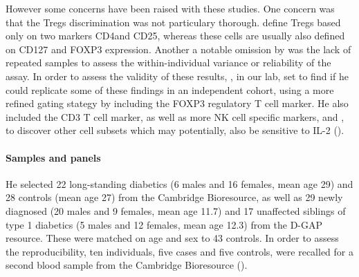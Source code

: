 However some concerns have been raised with these studies.
One concern was that the Tregs discrimination was not particulary thorough.
\citet{Long:2010ej} define Tregs based only on two markers CD4\positive and CD25\positive, whereas these cells are usually also defined on CD127 and FOXP3 expression.
Another a notable omission by \citet{Long:2010ej} was the lack of repeated samples to assess the within-individual variance or reliability of the assay.
In order to assess the validity of these results, , in our lab, set to find if he could replicate some of these findings in an independent cohort, using a more refined gating stategy by including the FOXP3 regulatory T cell marker.
He also included the CD3 T cell marker, as well as more NK cell specific markers,  and ,
to discover other cell subsets which may potentially, also be sensitive to IL-2 ().

\paragraph{Samples and panels}

He selected 22 long-standing diabetics (6 males and 16 females, mean age 29) and 28 controls (mean age 27) from the Cambridge Bioresource, as well as 29 newly diagnosed (20 males and 9 females, mean age 11.7) and 17 unaffected siblings of type 1 diabetics (5 males and 12 females, mean age 12.3) from the \Gls{D-GAP} resource.  
These were matched on age and sex to 43 controls.
In order to assess the reproducibility, ten individuals, five cases and five controls, were recalled for a second blood sample from the Cambridge Bioresource ().

